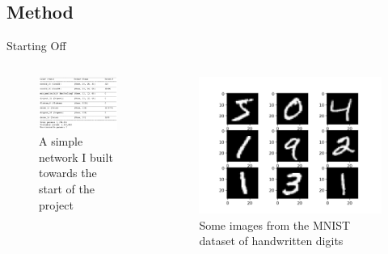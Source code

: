 \documentclass{beamer}
\begin{document}
\subsection{Method}
\begin{frame}{Starting Off}
    \begin{columns}
    \begin{column}{0.5\textwidth}
    \begin{figure}
        \centering
        \includegraphics[width=\textwidth]{Figures/simplenetwork.png}
        \caption{A simple network I built towards the start of the project}
        \label{fig:simplenetwork}
    \end{figure}
    \end{column}
    \begin{column}{0.5\textwidth}
    \begin{figure}
        \centering
        \includegraphics[width=\textwidth]{Figures/MNIST_Image.png}
        \caption{Some images from the MNIST dataset of handwritten digits}
        \label{fig:mnist}
    \end{figure}
    \end{column}
    \end{columns}
\end{frame}
\end{document}
